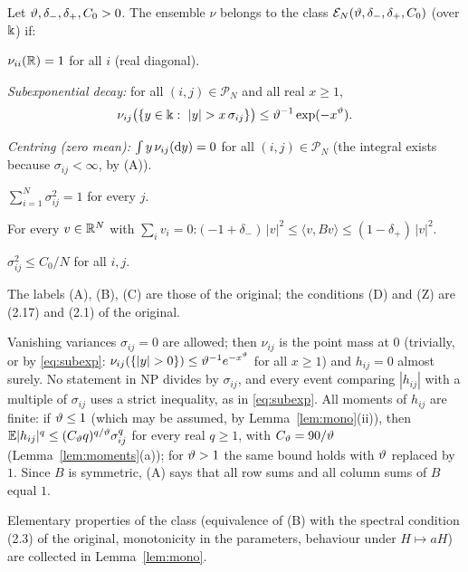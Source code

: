 \begin{definition}[Assumptions]\label{def:ass}
Let $\vartheta,\delta_-,\delta_+,C_0>0$. The ensemble $\nu$ belongs to the class $\mathcal E_N(\vartheta,\delta_-,\delta_+,C_0)$ (over $\Bbbk$) if:
\begin{description}[leftmargin=2.2em,itemsep=1pt]
\item[(R)] $\nu_{ii}(\mathbb{R})=1$ for all $i$ (real diagonal).
\item[(D)] \emph{Subexponential decay:} for all $(i,j)\in\mathcal P_N$ and all real $x\ge1$,
\begin{equation}\label{eq:subexp}
 \nu_{ij}\big(\{y\in\kk:\ |y|> x\,\sigma_{ij}\}\big)\le \vth^{-1}\exp(-x^{\vth}).
\end{equation}
\item[(Z)] \emph{Centring (zero mean):} $\int y\,\nu_{ij}(\mathrm{d} y)=0$ for all $(i,j)\in\mathcal P_N$ (the integral exists because $\sigma_{ij}<\infty$, by \textup{(A)}).
\item[(A)] $\sum_{i=1}^N\sigma_{ij}^2=1$ for every $j$.
\item[(B)] For every $v\in\mathbb{R}^N$ with $\sum_iv_i=0$:\quad $(-1+\delta_-)\,|v|^2\le \langle v,Bv\rangle\le(1-\delta_+)\,|v|^2$.
\item[(C)] $\sigma_{ij}^2\le C_0/N$ for all $i,j$.
\end{description}
The labels \textup{(A), (B), (C)} are those of the original; the conditions \textup{(D)} and \textup{(Z)} are (2.17) and (2.1) of the original.
\end{definition}
\noindent Vanishing variances $\sigma_{ij}=0$ are allowed; then $\nu_{ij}$ is the point mass at $0$ (trivially, or by \eqref{eq:subexp}: $\nu_{ij}(\{|y|>0\})\le\vth^{-1}e^{-x^\vth}$ for all $x\ge1$) and $h_{ij}=0$ almost surely. No statement in NP divides by $\sigma_{ij}$,
and every event comparing $|h_{ij}|$ with a multiple of $\sigma_{ij}$ uses a strict inequality, as in \eqref{eq:subexp}.
All moments of $h_{ij}$ are finite: if $\vartheta\le1$ (which may be assumed, by Lemma~\ref{lem:mono}(ii)), then $\mathbb{E}|h_{ij}|^q\le(C_\vartheta q)^{q/\vartheta}\sigma_{ij}^q$ for every real $q\ge1$, with $C_\vartheta=90/\vartheta$ (Lemma~\ref{lem:moments}(a)); for $\vartheta>1$ the same bound holds with $\vartheta$ replaced by $1$.
Since $B$ is symmetric, (A) says that all row sums and all column sums of $B$ equal $1$.

Elementary properties of the class (equivalence of (B) with the spectral condition (2.3) of the original, monotonicity in the parameters, behaviour under $H\mapsto aH$) are collected in Lemma~\ref{lem:mono}.


